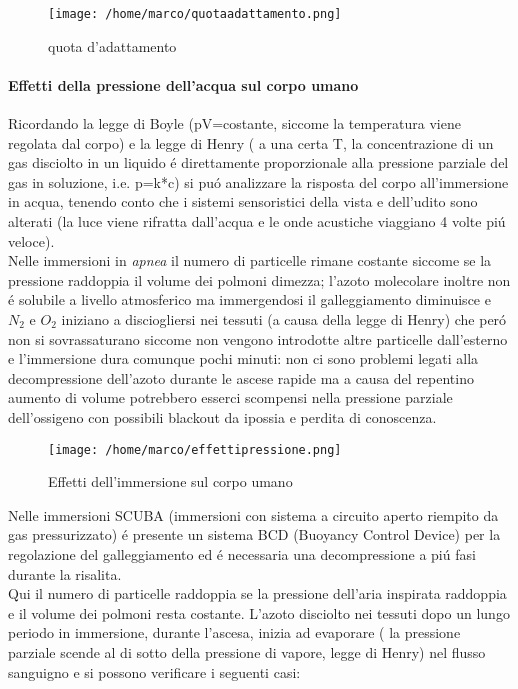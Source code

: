 \documentclass[10pt]{article}
\begin{document}
\begin{figure}[h!]
\centering
\texttt{[image: /home/marco/quotaadattamento.png]}
\caption{quota d'adattamento}
\label{fig:quotaadatt}
\end{figure} 
\paragraph{Effetti della pressione dell'acqua sul corpo umano}
Ricordando la legge di Boyle (pV=costante, siccome la temperatura viene regolata dal corpo) e la legge di Henry ( a una certa T, la concentrazione di un gas disciolto in un liquido é direttamente proporzionale alla pressione parziale del gas in soluzione, i.e. p=k*c) si puó analizzare la risposta del corpo all'immersione in acqua, tenendo conto che i sistemi sensoristici della vista e dell'udito sono alterati (la luce viene rifratta dall'acqua e le onde acustiche viaggiano 4 volte piú veloce). \\
Nelle immersioni in \textit{apnea} il numero di particelle rimane costante siccome se la pressione raddoppia il volume dei polmoni dimezza; l'azoto molecolare inoltre non é solubile a livello atmosferico ma immergendosi il galleggiamento diminuisce e $N_2$ e $O_2$ iniziano a disciogliersi nei tessuti (a causa della legge di Henry) che peró non si sovrassaturano siccome non vengono introdotte altre particelle dall'esterno e l'immersione dura comunque pochi minuti: non ci sono problemi legati alla decompressione dell'azoto durante le ascese rapide ma a causa del repentino aumento di volume potrebbero esserci scompensi nella pressione parziale dell'ossigeno con possibili blackout da ipossia e perdita di conoscenza.
\begin{figure}[h!]
\centering
\texttt{[image: /home/marco/effettipressione.png]}
\caption{Effetti dell'immersione sul corpo umano}
\label{fig:effetti_press}
\end{figure}
Nelle immersioni SCUBA (immersioni con sistema a circuito aperto riempito da gas pressurizzato) é presente un sistema BCD (Buoyancy Control Device) per la regolazione del galleggiamento ed é necessaria una decompressione a piú fasi durante la risalita. \\ Qui il numero di particelle raddoppia se la pressione dell'aria inspirata raddoppia e il volume dei polmoni resta costante. 
L'azoto disciolto nei tessuti dopo un lungo periodo in immersione, durante l'ascesa, inizia ad evaporare ( la pressione parziale scende al di sotto della pressione di vapore, legge di Henry) nel flusso sanguigno e si possono verificare i seguenti casi:
\end{document}
